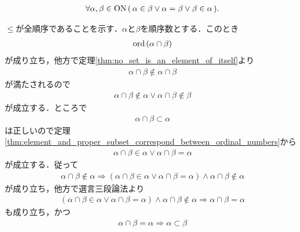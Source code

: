 	\begin{screen}
		\begin{thm}
		\label{thm:ON_is_totally_ordered}
			\begin{align}
				\forall \alpha,\beta \in \mathrm{ON}\,
				(\, \alpha \in \beta \vee \alpha = \beta \vee \beta \in \alpha\, ).
			\end{align}
		\end{thm}
	\end{screen}
	
	\begin{sketch}
		$\leq$が全順序であることを示す．$\alpha$と$\beta$を順序数とする．このとき
				\begin{align}
					\operatorname*{ord}\hspace{0.15em}(\alpha \cap \beta)
				\end{align}
				が成り立ち，他方で定理\ref{thm:no_set_is_an_element_of_itself}より
				\begin{align}
					\alpha \cap \beta \notin \alpha \cap \beta
				\end{align}
				が満たされるので
				\begin{align}
					\alpha \cap \beta \notin \alpha \vee \alpha \cap \beta \notin \beta
					\label{eq:thm_On_is_wellordered_5}
				\end{align}
				が成立する．ところで
				\begin{align}
					\alpha \cap \beta \subset \alpha
				\end{align}
				は正しいので定理\ref{thm:element_and_proper_subset_correspond_between_ordinal_numbers}から
				\begin{align}
					\alpha \cap \beta \in \alpha \vee \alpha \cap \beta = \alpha
				\end{align}
				が成立する．従って
				\begin{align}
					\alpha \cap \beta \notin \alpha \Longrightarrow 
					(\alpha \cap \beta \in \alpha \vee \alpha \cap \beta = \alpha) \wedge \alpha \cap \beta \notin \alpha
					\label{eq:thm_On_is_wellordered_2}
				\end{align}
				が成り立ち，他方で選言三段論法より
				\begin{align}
					(\alpha \cap \beta \in \alpha \vee \alpha \cap \beta = \alpha) \wedge \alpha \cap \beta \notin \alpha
					\Longrightarrow \alpha \cap \beta = \alpha
					\label{eq:thm_On_is_wellordered_3}
				\end{align}
				も成り立ち，かつ
				\begin{align}
					\alpha \cap \beta = \alpha \Longrightarrow \alpha \subset \beta
					\label{eq:thm_On_is_wellordered_4}

\end{align}
\end{sketch}
